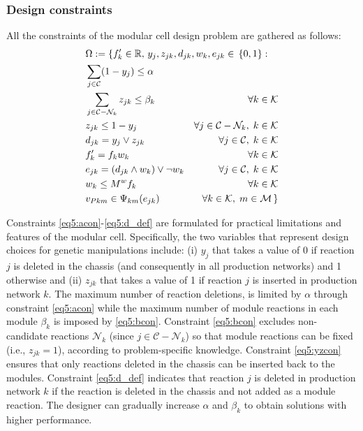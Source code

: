 \subsubsection{Design constraints} \label{sec:problem_constraints}
All the constraints of the modular cell design problem are gathered as follows:
\begin{alignat}{2}
& \mathrlap{	 \Omega:=\{f'_k \in \mathbb{R}, \, y_j, z_{jk}, d_{jk}, w_{k}, e_{jk} \in \, \{0,1\} : }\\ %
& \sum_{j\in \mathcal{C}} (1-y_j)\le \alpha 						\label{eq5:acon}\\
& \sum_{j\in \mathcal{C} - \mathcal{N}_k }z_{jk} \le \beta_k & \forall k\in \mathcal{K} 	\label{eq5:bcon}\\
& z_{jk}\le 1-y_j  & \forall j\in \mathcal{C} - \mathcal{N}_k , \;  k\in \mathcal{K}	\label{eq5:yzcon}\\
& d_{jk} = y_j \lor z_{jk} & \forall j \in \mathcal{C} ,\;  k \in \mathcal{K} \label{eq5:d_def}\\
& f'_k = f_k w_k & \forall k \in \mathcal{K} \label{eq5:fprime}\\
& e_{jk} = (d_{jk} \land w_k) \lor \lnot w_k & \forall j \in \mathcal{C} ,\;  k \in \mathcal{K} \label{eq5:e_def} \\
& w_k \le M^w f_k & \forall k \in \mathcal{K} \label{eq5:w_symmetry}\\
& v_{Pkm} \in \Psi_{km}(e_{jk})  & \forall k \in \mathcal{K} ,\;  m \in \mathcal{M} \label{eq5:psi} \, \}
\end{alignat}

\noindent Constraints \eqref{eq5:acon}-\eqref{eq5:d_def} are formulated for practical limitations and features of the modular cell. Specifically, the two variables that represent design choices for genetic manipulations include: (i) $y_j$ that takes a value of 0 if reaction $j$ is deleted in the chassis (and consequently in all production networks) and 1 otherwise and (ii) $z_{jk}$ that takes a value of 1 if reaction $j$ is inserted in production network $k$. The maximum number of reaction deletions, is limited by $\alpha$ through constraint \eqref{eq5:acon} while the maximum number of module reactions in each module $\beta_k$ is imposed by \eqref{eq5:bcon}. Constraint \eqref{eq5:bcon} excludes non-candidate reactions $\mathcal{N}_k$ (since $j\in \mathcal{C} - \mathcal{N}_k$)  so that module reactions can be fixed  (i.e., $z_{jk}=1$), according to problem-specific knowledge. Constraint \eqref{eq5:yzcon} ensures that only reactions deleted in the chassis can be inserted back to the modules.
Constraint \eqref{eq5:d_def} indicates that reaction $j$ is deleted in production network $k$ if the reaction is deleted in the chassis and not added as a module reaction. The designer can gradually increase $\alpha$ and $\beta_k$ to obtain solutions with higher performance.

